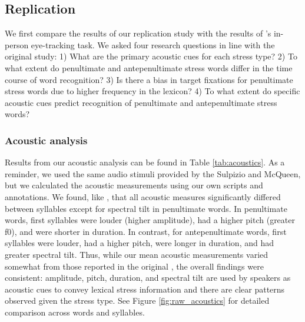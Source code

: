 \subsection{Replication}

We first compare the results of our replication study with the results of \cite{Sulpizio_McQueen_2012}'s in-person eye-tracking task. We asked four research questions in line with the original study: 1) What are the primary acoustic cues for each stress type? 2) To what extent do penultimate and antepenultimate stress words differ in the time course of word recognition? 3) Is there a bias in target fixations for penultimate stress words due to higher frequency in the lexicon? 4) To what extent do specific acoustic cues predict recognition of penultimate and antepenultimate stress words?  

\subsubsection{Acoustic analysis}
Results from our acoustic analysis can be found in Table \ref{tab:acoustics}. As a reminder, we used the same audio stimuli provided by the Sulpizio and McQueen, but we calculated the acoustic measurements using our own scripts and annotations. We found, like \cite{Sulpizio_McQueen_2012}, that all acoustic measures significantly differed between syllables except for spectral tilt in penultimate words. In penultimate words, first syllables were louder (higher amplitude), had a higher pitch (greater f0), and were shorter in duration. In contrast, for antepenultimate words, first syllables were louder, had a higher pitch, were longer in duration, and had greater spectral tilt. Thus, while our mean acoustic measurements varied somewhat from those reported in the original \cite{Sulpizio_McQueen_2012}, the overall findings were consistent: amplitude, pitch, duration, and spectral tilt are used by speakers as acoustic cues to convey lexical stress information and there are clear patterns observed given the stress type. See Figure \ref{fig:raw_acoustics} for detailed comparison across words and syllables. 

